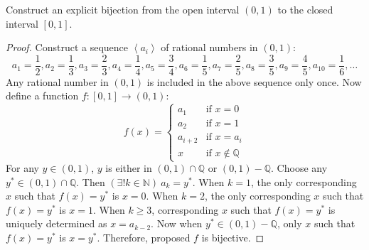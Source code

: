 \documentclass[../main.tex]{subfiles}
\begin{document}
\begin{exercise}
    Construct an explicit bijection from the open interval $(0, 1)$ to the closed interval $[0, 1]$.
\end{exercise}
\begin{proof}
    Construct a sequence $\left< a_i \right>$ of rational numbers in $(0, 1)$:
    \[
        a_1 = \frac 12, a_2 = \frac 13, a_3 = \frac 23, a_4 = \frac 14, a_5 = \frac 34, a_6 = \frac 15, a_7 = \frac 25, a_8 = \frac 35, a_9 = \frac 45, a_{10} = \frac 16, \dots
    \]
    Any rational number in $(0, 1)$ is included in the above sequence only once.
    Now define a function $f: [0, 1] \rightarrow (0, 1)$:
    \[
        f(x) = \begin{cases}
            a_1 &\text{if } x = 0\\
            a_2 &\text{if } x = 1\\
            a_{i + 2} &\text{if } x = a_i\\
            x &\text{if } x \notin \mathbb{Q}
        \end{cases}
    \]
    For any $y \in (0, 1)$, $y$ is either in $(0, 1) \cap \mathbb Q$ or $(0, 1) - \mathbb Q$.
    Choose any $y^* \in (0, 1) \cap \mathbb Q$.
    Then $(\exists ! k \in \mathbb{N})\ a_k = y^*$.
    When $k = 1$, the only corresponding $x$ such that $f(x) = y^*$ is $x = 0$.
    When $k = 2$, the only corresponding $x$ such that $f(x) = y^*$ is $x = 1$.
    When $k \geq 3$, corresponding $x$ such that $f(x) = y^*$ is uniquely determined as $x = a_{k - 2}$.
    Now when $y^* \in (0, 1) - \mathbb{Q}$, only $x$ such that $f(x) = y^*$ is $x = y^*$.
    Therefore, proposed $f$ is bijective.
\end{proof}
\end{document}
